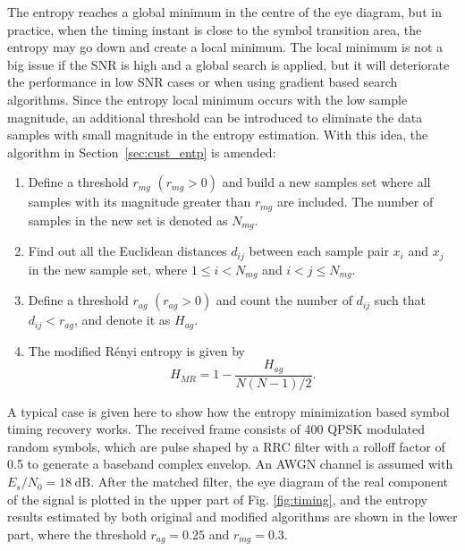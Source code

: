 \documentclass[journal,comsoc]{IEEEtran}
\begin{document}
The entropy reaches a global minimum in the centre of the eye diagram, but in practice, when the timing instant is close to the symbol transition area, the entropy may go down and create a local minimum. 
The local minimum is not a big issue if the SNR is high and a global search is applied, but it will deteriorate the performance in low SNR cases or when using gradient based search algorithms.
Since the entropy local minimum occurs with the low sample magnitude, an additional threshold can be introduced to eliminate the data samples with small magnitude in the entropy estimation.
With this idea, the algorithm in Section~\ref{sec:cust_entp} is amended:

\begin{enumerate}
\item Define a threshold \(r_{mg}\) \((r_{mg}>0)\) and build a new samples set where all samples with its magnitude greater than \(r_{mg}\) are included.
The number of samples in the new set is denoted as \(N_{mg}\).
\item Find out all the Euclidean distances \(d_{ij}\) between each sample pair \(x_i\) and \(x_j\) in the new sample set, where \(1\le i<N_{mg}\) and \( i<j \le N_{mg}\). 
\item Define a threshold \(r_{ag}\) \((r_{ag}>0)\) and count the number of \(d_{ij}\) such that $d_{ij}<r_{ag}$, and denote it as $H_{ag}$.
\item The modified R\'enyi entropy is given by
\begin{equation}
H_{MR}= 1- \frac{ H_{ag}}{ N(N-1)/2}.
\label{eq:entorpy_ad2}
\end{equation}
\end{enumerate}



A typical case is given here to show how the entropy minimization based symbol timing recovery works.
The received frame consists of 400 QPSK modulated random symbols, 
which are pulse shaped by a RRC filter with a rolloff factor of 0.5 to generate a baseband complex envelop.
An AWGN channel is assumed with $E_s/N_0 = 18~\text{dB}$. 
After the matched filter, the eye diagram of the real component of the signal is plotted in the upper part of Fig. \ref{fig:timing}, and the entropy results estimated by both original and modified algorithms are shown in the lower part,
where the threshold $r_{ag}=0.25$ and \(r_{mg}=0.3\).
\end{document}
